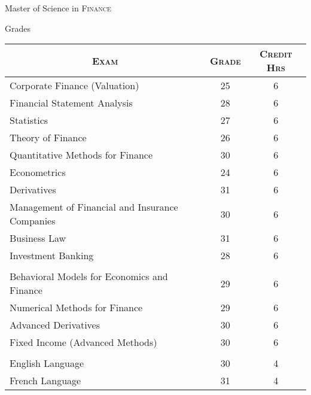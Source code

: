 \documentclass[a4paper,10pt]{article}
\begin{document}
\newpage
\par{\centering\Large \hypertarget{grds}{Master of Science in \textsc{Finance}}\par}\large{\centering Grades\par}\normalsize
\begin{center}
	\begin{tabular}{lcc}
		\multicolumn{1}{c}{\textsc{Exam}}               & \textsc{Grade} & \textsc{Credit Hrs} \\ \hline
		Corporate Finance (Valuation)                   & 25             & 6                   \\
		Financial Statement Analysis                    & 28             & 6                   \\
		Statistics                                      & 27             & 6                   \\
		Theory of Finance                               & 26             & 6                   \\
		Quantitative Methods for Finance                & 30             & 6                   \\
		Econometrics                                    & 24             & 6                   \\
		Derivatives                                     & 31             & 6                   \\
		Management of Financial and Insurance Companies & 30             & 6                   \\
		Business Law                                    & 31             & 6                   \\
		Investment Banking                              & 28             & 6                   \\ \\

		Behavioral Models for Economics and Finance     & 29             & 6                   \\
		Numerical Methods for Finance                   & 29             & 6                   \\
		Advanced Derivatives                            & 30             & 6                   \\
		Fixed Income (Advanced Methods)                 & 30             & 6                   \\ \\

		English Language                                & 30             & 4                   \\
		French Language                                 & 31             & 4                   \\


\end{tabular}
\end{center}
\end{document}
